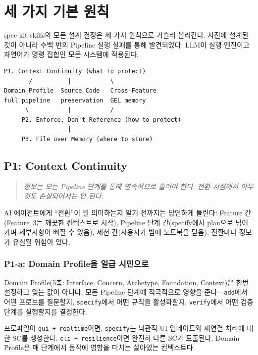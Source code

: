\documentclass[11pt,a4paper,openright,twoside]{report}
\begin{document}
\chapter{세 가지 기본 원칙}
\label{ch:principles}

spec-kit-skills의 모든 설계 결정은 세 가지 원칙으로 거슬러 올라간다. 사전에 설계된 것이 아니라 수백 번의 Pipeline 실행 실패를 통해 발견되었다. LLM이 실행 엔진이고 자연어가 명령 집합인 모든 시스템에 적용된다.

\begin{lstlisting}[title={Principle Hierarchy}]
        P1. Context Continuity (what to protect)
       /          |           \
Domain Profile  Source Code   Cross-Feature
full pipeline   preservation  GEL memory
      \           |           /
     P2. Enforce, Don't Reference (how to protect)
                  |
     P3. File over Memory (where to store)
\end{lstlisting}


\section{P1: Context Continuity}

\begin{quote}
\emph{정보는 모든 Pipeline 단계를 통해 연속적으로 흘러야 한다. 전환 시점에서 아무것도 손실되어서는 안 된다.}
\end{quote}

AI 에이전트에게 ``전환''이 뭘 의미하는지 알기 전까지는 당연하게 들린다: Feature 간(Feature~3는 깨끗한 컨텍스트로 시작), Pipeline 단계 간(specify에서 plan으로 넘어가며 세부사항이 빠질 수 있음), 세션 간(사용자가 밤에 노트북을 닫음). 전환마다 정보가 유실될 위험이 있다.

\subsection{P1-a: Domain Profile을 일급 시민으로}

Domain Profile(5축: Interface, Concern, Archetype, Foundation, Context)은 한번 설정하고 잊는 값이 아니다. 모든 Pipeline 단계에 적극적으로 영향을 준다---\texttt{add}에서 어떤 프로브를 질문할지, \texttt{specify}에서 어떤 규칙을 활성화할지, \texttt{verify}에서 어떤 검증 단계를 실행할지를 결정한다.

프로파일이 \texttt{gui + realtime}이면, \texttt{specify}는 낙관적 UI 업데이트와 재연결 처리에 대한 SC를 생성한다. \texttt{cli + resilience}이면 완전히 다른 SC가 도출된다. Domain Profile은 매 단계에서 동작에 영향을 미치는 살아있는 컨텍스트다.
\end{document}

